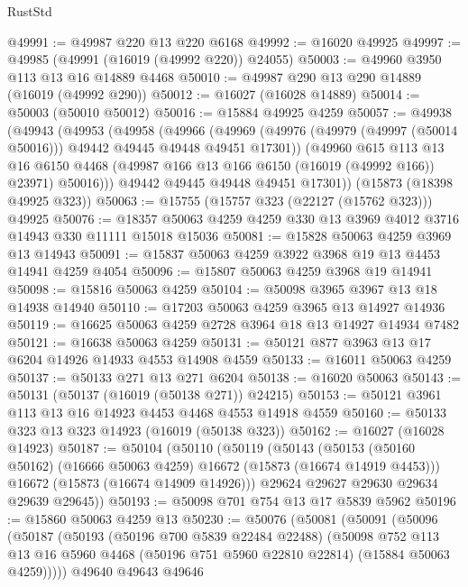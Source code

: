 \begin{lexlean}{RustStd}
\begin{coremodule}
@49991 := @49987 @220 @13 @220 @6168
@49992 := @16020 @49925
@49997 := @49985 (@49991 (@16019 (@49992 @220)) @24055)
@50003 := @49960 @3950 @113 @13 @16 @14889 @4468
@50010 := @49987 @290 @13 @290 @14889 (@16019 (@49992 @290))
@50012 := @16027 (@16028 @14889)
@50014 := @50003 (@50010 @50012)
@50016 := @15884 @49925 @4259
@50057 := @49938
    (@49943
      (@49953
        (@49958
          (@49966
            (@49969 (@49976 (@49979 (@49997 (@50014 @50016))) @49442 @49445 @49448 @49451 @17301))
            (@49960
              @615
              @113
              @13
              @16
              @6150
              @4468
              (@49987 @166 @13 @166 @6150 (@16019 (@49992 @166)) @23971)
              @50016)))
        @49442
        @49445
        @49448
        @49451
        @17301))
    (@15873 (@18398 @49925 @323))
@50063 := @15755 (@15757 @323 (@22127 (@15762 @323))) @49925
@50076 := @18357 @50063 @4259 @4259 @330 @13 @3969 @4012 @3716 @14943 @330 @11111 @15018 @15036
@50081 := @15828 @50063 @4259 @3969 @13 @14943
@50091 := @15837 @50063 @4259 @3922 @3968 @19 @13 @4453 @14941 @4259 @4054
@50096 := @15807 @50063 @4259 @3968 @19 @14941
@50098 := @15816 @50063 @4259
@50104 := @50098 @3965 @3967 @13 @18 @14938 @14940
@50110 := @17203 @50063 @4259 @3965 @13 @14927 @14936
@50119 := @16625 @50063 @4259 @2728 @3964 @18 @13 @14927 @14934 @7482
@50121 := @16638 @50063 @4259
@50131 := @50121 @877 @3963 @13 @17 @6204 @14926 @14933 @4553 @14908 @4559
@50133 := @16011 @50063 @4259
@50137 := @50133 @271 @13 @271 @6204
@50138 := @16020 @50063
@50143 := @50131 (@50137 (@16019 (@50138 @271)) @24215)
@50153 := @50121 @3961 @113 @13 @16 @14923 @4453 @4468 @4553 @14918 @4559
@50160 := @50133 @323 @13 @323 @14923 (@16019 (@50138 @323))
@50162 := @16027 (@16028 @14923)
@50187 := @50104
    (@50110
      (@50119
        (@50143
          (@50153 (@50160 @50162) (@16666 @50063 @4259) @16672 (@15873 (@16674 @14919 @4453)))
          @16672
          (@15873 (@16674 @14909 @14926)))
        @29624
        @29627
        @29630
        @29634
        @29639
        @29645))
@50193 := @50098 @701 @754 @13 @17 @5839 @5962
@50196 := @15860 @50063 @4259 @13
@50230 := @50076
    (@50081
      (@50091
        (@50096
          (@50187
            (@50193
              (@50196 @700 @5839 @22484 @22488)
              (@50098
                @752
                @113
                @13
                @16
                @5960
                @4468
                (@50196 @751 @5960 @22810 @22814)
                (@15884 @50063 @4259)))))
        @49640
        @49643
        @49646

\end{coremodule}
\end{lexlean}
